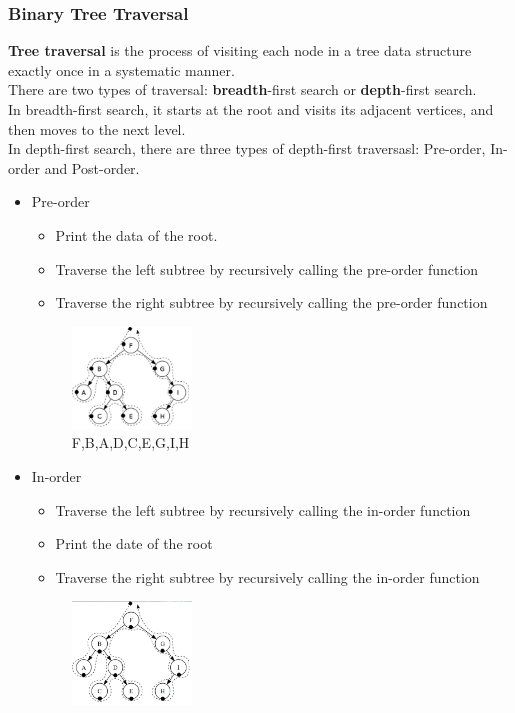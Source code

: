 \documentclass[12pt]{article}
\begin{document}
\subsubsection{Binary Tree Traversal}
\textbf{Tree traversal} is the process of visiting each node in a tree data structure exactly once in a systematic manner.\\
There are two types of traversal: \textbf{breadth}-first search or \textbf{depth}-first search.\\
In breadth-first search, it starts at the root and visits its adjacent vertices, and then moves to the next level.\\
In depth-first search, there are three types of depth-first traversasl: Pre-order, In-order and Post-order.
\begin{itemize}
\item Pre-order
\begin{itemize}
\item Print the data of the root.
\item Traverse the left subtree by recursively calling the pre-order function
\item Traverse the right subtree by recursively calling the pre-order function
\end{itemize}
\begin{figure}[h]
\centering
\includegraphics[width=0.3\textwidth]{1.jpg}
\caption{F,B,A,D,C,E,G,I,H}
\end{figure}
\item In-order
\begin{itemize}
\item Traverse the left subtree by recursively calling the in-order function
\clearpage
\item Print the date of the root
\item Traverse the right subtree by recursively calling the in-order function
\end{itemize}
\begin{figure}[h]
\centering
\includegraphics[width=0.3\textwidth]{2.jpg}

\end{figure}
\end{itemize}
\end{document}
